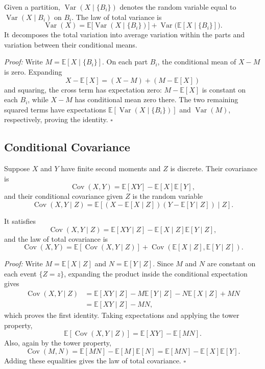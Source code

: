 \documentclass[a4paper,11pt,abstracton]{scrartcl}
\theoremstyle{dotlessP}
\theoremstyle{dotlessS}
\theoremstyle{remark}
\theoremstyle{definition}
\begin{document}
\begin{problem_box}
Given a partition, $\operatorname{Var}(X\mid\{B_i\})$ denotes the random variable equal to $\operatorname{Var}(X\mid B_i)$ on $B_i$. The law of total variance is
\[
  \operatorname{Var}(X)
  =\mathbb{E}\bigl[\operatorname{Var}(X\mid\{B_i\})\bigr]
   +\operatorname{Var}\bigl(\mathbb{E}[X\mid\{B_i\}]\bigr).
\]
It decomposes the total variation into average variation within the parts and variation between their conditional means.
\end{problem_box}

\begin{claim_box}
\textit{Proof:}
Write $M=\mathbb{E}[X\mid\{B_i\}]$. On each part $B_i$, the conditional mean of $X-M$ is zero. Expanding
\[
  X-\mathbb{E}[X]=(X-M)+(M-\mathbb{E}[X])
\]
and squaring, the cross term has expectation zero: $M-\mathbb{E}[X]$ is constant on each $B_i$, while $X-M$ has conditional mean zero there. The two remaining squared terms have expectations $\mathbb{E}[\operatorname{Var}(X\mid\{B_i\})]$ and $\operatorname{Var}(M)$, respectively, proving the identity.
\hfill$\square$
\end{claim_box}

\subsection{Conditional Covariance}

Suppose $X$ and $Y$ have finite second moments and $Z$ is discrete. Their covariance is
\[
  \operatorname{Cov}(X,Y)=\mathbb{E}[XY]-\mathbb{E}[X]\mathbb{E}[Y],
\]
and their conditional covariance given $Z$ is the random variable
\[
  \operatorname{Cov}(X,Y\mid Z)
  =\mathbb{E}\!\left[(X-\mathbb{E}[X\mid Z])(Y-\mathbb{E}[Y\mid Z])\mid Z\right].
\]
\begin{problem_box}
It satisfies
\[
  \operatorname{Cov}(X,Y\mid Z)
  =\mathbb{E}[XY\mid Z]-\mathbb{E}[X\mid Z]\mathbb{E}[Y\mid Z],
\]
and the law of total covariance is
\[
  \operatorname{Cov}(X,Y)
  =\mathbb{E}[\operatorname{Cov}(X,Y\mid Z)]
   +\operatorname{Cov}(\mathbb{E}[X\mid Z],\mathbb{E}[Y\mid Z]).
\]
\end{problem_box}

\begin{claim_box}
\textit{Proof:}
Write $M=\mathbb{E}[X\mid Z]$ and $N=\mathbb{E}[Y\mid Z]$. Since $M$ and $N$ are constant on each event $\{Z=z\}$, expanding the product inside the conditional expectation gives
\[
\begin{aligned}
  \operatorname{Cov}(X,Y\mid Z)
  &=\mathbb{E}[XY\mid Z]-M\mathbb{E}[Y\mid Z]
    -N\mathbb{E}[X\mid Z]+MN\\
  &=\mathbb{E}[XY\mid Z]-MN,
\end{aligned}
\]
which proves the first identity. Taking expectations and applying the tower property,
\[
  \mathbb{E}[\operatorname{Cov}(X,Y\mid Z)]
  =\mathbb{E}[XY]-\mathbb{E}[MN].
\]
Also, again by the tower property,
\[
  \operatorname{Cov}(M,N)
  =\mathbb{E}[MN]-\mathbb{E}[M]\mathbb{E}[N]
  =\mathbb{E}[MN]-\mathbb{E}[X]\mathbb{E}[Y].
\]
Adding these equalities gives the law of total covariance.
\hfill$\square$
\end{claim_box}
\end{document}
